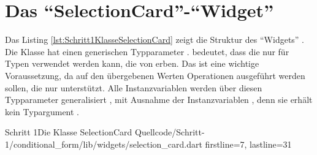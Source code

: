 
\clearpage
\section{Das \enquote{SelectionCard}-\enquote{Widget}}

Das Listing \ref{lst:Schritt1KlasseSelectionCard} zeigt die Struktur des \enquote{Widgets} .
Die Klasse hat einen generischen Typparameter .
 bedeutet, dass die  nur für Typen verwendet werden kann, die von  erben.
Das ist eine wichtige Voraussetzung, da auf den übergebenen Werten Operationen ausgeführt werden sollen, die nur  unterstützt.
Alle Instanzvariablen werden über diesen Typparameter generalisiert , mit Ausnahme der Instanzvariablen , denn sie erhält kein Typargument .

\begin{alexlisting}{Schritt 1}{Die Klasse SelectionCard}
  {Quellcode/Schritt-1/conditional_form/lib/widgets/selection_card.dart}
  {firstline=7, lastline=31}
  \label{lst:Schritt1KlasseSelectionCard}
\end{alexlisting}

